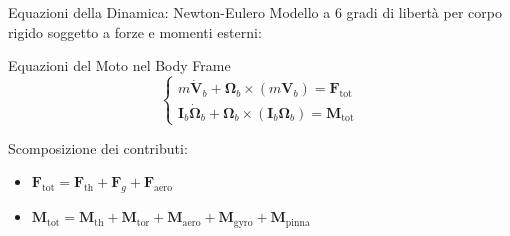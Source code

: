 \documentclass[aspectratio=169]{beamer} %
\begin{document}
\begin{frame}{Equazioni della Dinamica: Newton-Eulero}
    Modello a 6 gradi di libertà per corpo rigido soggetto a forze e momenti esterni:
    
    \begin{block}{Equazioni del Moto nel Body Frame}
    \begin{equation}
        \begin{cases}
            m \bm{\dot{V}}_b + \bm{\Omega}_b \times (m \bm{V}_b) = \bm{F}_{\text{tot}} \\
            \mathbf{I}_b \bm{\dot{\Omega}}_b + \bm{\Omega}_b \times (\mathbf{I}_b \bm{\Omega}_b) = \bm{M}_{\text{tot}}
        \end{cases}
    \end{equation}
    \end{block}
    
    Scomposizione dei contributi:
    \begin{itemize}
        \item $\bm{F}_{\text{tot}} = \bm{F}_{\text{th}} + \bm{F}_g + \bm{F}_{\text{aero}}$
        \item $\bm{M}_{\text{tot}} = \bm{M}_{\text{th}} + \bm{M}_{\text{tor}} + \bm{M}_{\text{aero}} + \bm{M}_{\text{gyro}} + \bm{M}_{\text{pinna}}$
    \end{itemize}
\end{frame}
\end{document}
